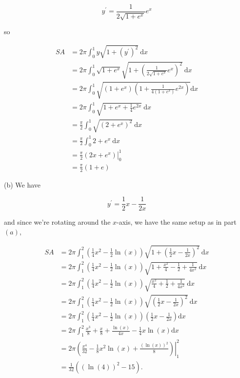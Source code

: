 \documentclass[10pt]{article}
\begin{document}
$$
y^{\prime}=\frac{1}{2 \sqrt{1+e^{x}}} e^{x}
$$

so

$$
\begin{aligned}
S A & =2 \pi \int_{0}^{1} y \sqrt{1+\left(y^{\prime}\right)^{2}} \mathrm{~d} x \\
& =2 \pi \int_{0}^{1} \sqrt{1+e^{x}} \sqrt{1+\left(\frac{1}{2 \sqrt{1+e^{x}}} e^{x}\right)^{2}} \mathrm{~d} x \\
& =2 \pi \int_{0}^{1} \sqrt{\left(1+e^{x}\right)\left(1+\frac{1}{4\left(1+e^{x}\right)} e^{2 x}\right)} \mathrm{d} x \\
& =2 \pi \int_{0}^{1} \sqrt{1+e^{x}+\frac{1}{4} e^{2 x}} \mathrm{~d} x \\
& =\frac{\pi}{2} \int_{0}^{1} \sqrt{\left(2+e^{x}\right)^{2}} \mathrm{~d} x \\
& =\frac{\pi}{2} \int_{0}^{1} 2+e^{x} \mathrm{~d} x \\
& =\left.\frac{\pi}{2}\left(2 x+e^{x}\right)\right|_{0} ^{1} \\
& =\frac{\pi}{2}(1+e)
\end{aligned}
$$

(b) We have

$$
y^{\prime}=\frac{1}{2} x-\frac{1}{2 x}
$$

and since we're rotating around the $x$-axis, we have the same setup as in part $(a)$,

$$
\begin{aligned}
S A & =2 \pi \int_{1}^{2}\left(\frac{1}{4} x^{2}-\frac{1}{2} \ln (x)\right) \sqrt{1+\left(\frac{1}{2} x-\frac{1}{2 x}\right)^{2}} \mathrm{~d} x \\
& =2 \pi \int_{1}^{2}\left(\frac{1}{4} x^{2}-\frac{1}{2} \ln (x)\right) \sqrt{1+\frac{x^{2}}{4}-\frac{1}{2}+\frac{1}{4 x^{2}}} \mathrm{~d} x \\
& =2 \pi \int_{1}^{2}\left(\frac{1}{4} x^{2}-\frac{1}{2} \ln (x)\right) \sqrt{\frac{x^{2}}{4}+\frac{1}{2}+\frac{1}{4 x^{2}}} \mathrm{~d} x \\
& =2 \pi \int_{1}^{2}\left(\frac{1}{4} x^{2}-\frac{1}{2} \ln (x)\right) \sqrt{\left(\frac{1}{2} x-\frac{1}{2 x}\right)^{2}} \mathrm{~d} x \\
& =2 \pi \int_{1}^{2}\left(\frac{1}{4} x^{2}-\frac{1}{2} \ln (x)\right)\left(\frac{1}{2} x-\frac{1}{2 x}\right) \mathrm{d} x \\
& =2 \pi \int_{1}^{2} \frac{x^{3}}{8}+\frac{x}{8}+\frac{\ln (x)}{4 x}-\frac{1}{4} x \ln (x) \mathrm{d} x \\
& =\left.2 \pi\left(\frac{x^{4}}{32}-\frac{1}{8} x^{2} \ln (x)+\frac{(\ln (x))^{2}}{8}\right)\right|_{1} ^{2} \\
& =\frac{1}{32}\left((\ln (4))^{2}-15\right) .
\end{aligned}
$$
\end{document}

